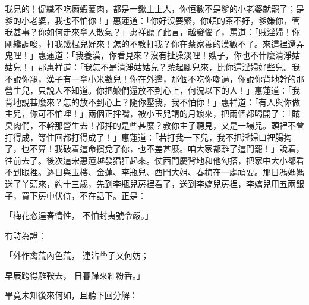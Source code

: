 我見的！促織不吃癩蝦蟇肉，都是一鍬土上人，你恒數不是爹的小老婆就罷了；是爹的小老婆，我也不怕你！」惠蓮道：「你好沒要緊，你頓的茶不好，爹嫌你，管我甚事？你如何走來拿人散氣？」惠祥聽了此言，越發惱了，罵道：「賊淫婦！你剛纔調唆，打我幾棍兒好來！怎的不教打我？你在蔡家養的漢數不了。來這裡還弄鬼哩！」惠蓮道：「我養漢，你看見來？沒有扯臊淡哩！嫂子，你也不什麼清淨姑姑兒！」那惠祥道：「我怎不是清淨姑姑兒？蹺起腳兒來，比你這淫婦好些兒。我不說你罷，漢子有一拿小米數兒！你在外邊，那個不吃你嘲過，你說你背地幹的那營生兒，只說人不知道。你把娘們還放不到心上，何況以下的人！」惠蓮道：「我背地說甚麼來？怎的放不到心上？隨你壓我，我不怕你！」惠祥道：「有人與你做主兒，你可不怕哩！」兩個正拌嘴，被小玉兒請的月娘來，把兩個都喝開了：「賊臭肉們，不幹那營生去！都拌的是些甚麼？教你主子聽見，又是一場兒。頭裡不曾打得成，等住回都打得成了！」惠蓮道：「若打我一下兒，我不把淫婦口裡腸抅了，也不算！我破着這命擯兌了你，也不差甚麼。咱大家都離了這門罷！」說着，往前去了。後次這宋惠蓮越發猖狂起來。仗西門慶背地和他勾搭，把家中大小都看不到眼裡。逐日與玉樓、金蓮、李瓶兒、西門大姐、春梅在一處頑耍。那日馮媽媽送了丫頭來，約十三歲，先到李瓶兒房裡看了，送到李嬌兒房裡，李嬌兒用五兩銀子，買下房中伏侍，不在話下。正是：

「梅花恣逞春情性，  不怕封夷號令嚴。」

有詩為證：

「外作禽荒內色荒，  連沾些子又何妨；

早辰跨得雕鞍去，  日暮歸來紅粉香。」

畢竟未知後來何如，且聽下回分解：

